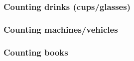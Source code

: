 \documentclass[../nihongo-gakushuu-kyouzai.tex]{subfiles}
\begin{document}
\begin{multicols}{2}
\subsubsection{Counting drinks (cups/glasses)}
\begin{center}
\label{tbl:appendix-vocab-nouns-counting-drinks-cups-glasses}
\end{center}


\subsubsection{Counting machines/vehicles}
\begin{center}
\label{tbl:appendix-vocab-nouns-counting-machines-vehicles}
\end{center}


\subsubsection{Counting books}
\begin{center}
\label{tbl:appendix-vocab-nouns-counting-books}
\end{center}



\end{multicols}
\end{document}
